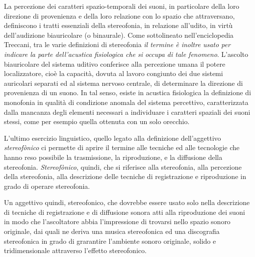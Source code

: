 La percezione dei caratteri spazio-temporali dei suoni, in particolare della
loro direzione di provenienza e della loro relazione con lo spazio che
attraversano, definiscono i tratti essenziali della stereofonia, in relazione
all'udito, in virtù dell’audizione biauricolare (o binaurale). Come sottolineato
nell'enciclopedia Treccani, tra le varie definizioni di stereofonia \emph{il
termine è inoltre usato per indicare la parte dell’acustica fisiologica
che si occupa di tale fenomeno}. L'ascolto biauricolare del sistema uditivo
conferisce alla percezione umana il potere localizzatore, cioè la capacità,
dovuta al lavoro congiunto dei due sistemi auricolari separati ed al sistema
nervoso centrale, di determinare la direzione di provenienza di un suono. In tal
senso, esiste in acustica fisiologica la definizione di monofonia in qualità di
condizione anomala del sistema percettivo, caratterizzata dalla mancanza degli
elementi necessari a individuare i caratteri spaziali dei suoni stessi, come per
esempio quella ottenuta con un solo orecchio.

L'ultimo esercizio linguistico, quello legato alla definizione dell'aggettivo
\emph{stereofònico} ci permette di aprire il termine alle tecniche ed alle
tecnologie che hanno reso possibile la trasmissione, la riproduzione,
e la diffusione della stereofonia. \emph{Stereofònico}, quindi, che si riferisce
alla stereofonia, alla percezione della stereofonia, alla descrizione delle
tecniche di registrazione e riproduzione in grado di operare stereofonia.

Un aggettivo quindi, stereofonico, che dovrebbe essere usato solo nella
descrizione di tecniche di registrazione e di diffusione sonora atti alla
riproduzione dei suoni in modo che l’ascoltatore abbia l’impressione di trovarsi
nello spazio sonoro originale, dai quali ne deriva una musica stereofonica ed
una discografia stereofonica in grado di grarantire l’ambiente sonoro originale,
solido e tridimensionale attraverso l’effetto stereofonico.

